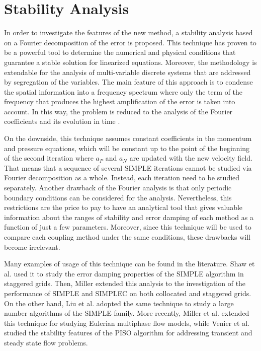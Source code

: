 \documentclass[final,3p,times,11pt,onecolumn]{myElsarticle}
\numberwithin{equation}{section}
\begin{document}
\section{Stability Analysis}
\label{sec:fourier}

In order to investigate the features of the new method, a stability analysis based on a Fourier decomposition of the error is proposed. This technique has proven to be a powerful tool to determine the numerical and physical conditions that guarantee a stable solution for linearized equations. Moreover, the methodology is extendable for the analysis of multi-variable discrete systems that are addressed by segregation of the variables. The main feature of this approach is to condense the spatial information into a frequency spectrum where only the term of the frequency that produces the highest amplification of the error is taken into account. In this way, the problem is reduced to the analysis of the Fourier coefficients and its evolution in time \cite{hirsch}. 

On the downside, this technique assumes constant coefficients in the momentum and pressure equations, which will be constant up to the point of the beginning of the second iteration where $a_P$ and $a_N$ are updated with the new velocity field. That means that a sequence of several SIMPLE iterations cannot be studied via Fourier decomposition as a whole. Instead, each iteration need to be studied separately. Another drawback of the Fourier analysis is that only periodic boundary conditions can be considered for the analysis. Nevertheless, this restrictions are the price to pay to have an analytical tool that gives valuable information about the ranges of stability and error damping of each method as a function of just a few parameters. Moreover, since this technique will be used to compare each coupling method under the same conditions, these drawbacks will become irrelevant.

Many examples of usage of this technique can be found in the literature. Shaw et al. \cite{shaw} used it to study the error damping properties of the SIMPLE algorithm in staggered grids. Then, Miller \cite{miller1} extended this analysis to the investigation of the performance of SIMPLE and SIMPLEC on both collocated and staggered grids. On the other hand, Liu et al. \cite{liu} adopted the same technique to study a large number algorithms of the SIMPLE family. More recently, Miller et al. \cite{miller2} extended this technique for studying Eulerian multiphase flow models, while Venier et al. \cite{venier} studied the stability features of the PISO algorithm for addressing transient and steady state flow problems.
\end{document}

